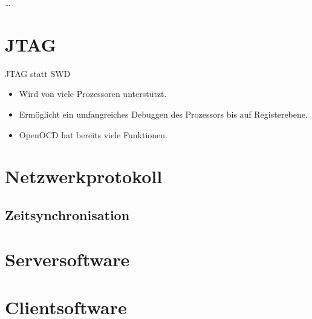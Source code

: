 \ldots
\section{JTAG}
JTAG statt SWD
\begin{itemize}
  \item Wird von viele Prozessoren unterstützt.
  \item Ermöglicht ein umfangreiches Debuggen des Prozessors bis auf
		Registerebene.
  \item OpenOCD hat bereits viele Funktionen.
\end{itemize}
\section{Netzwerkprotokoll}
\subsection{Zeitsynchronisation}
\section{Serversoftware}

\section{Clientsoftware}
\fi
